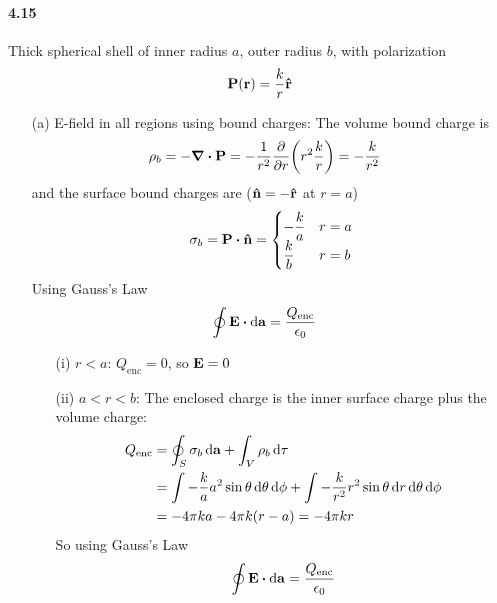 \documentclass[../main.tex]{subfiles}
\begin{document}
\pagestyle{fancy}

\setcounter{section}{7}

\paragraph{4.15} Thick spherical shell of inner radius $a$, outer radius $b$, with polarization
\begin{align*}
    \vb P (\vb r) = \frac{k}{r} \vu r    
\end{align*}
\begin{itemize}
    \item [(a)] E-field in all regions using bound charges: The volume bound charge is
    \begin{align*}
        \rho_b &= -\div \vb P = - \frac{1}{r^2} \pdv{r}(r^2 \frac{k}{r}) = -\frac{k}{r^2}
    \end{align*}
    and the surface bound charges are ($\vu n = -\vu r$ at $r = a$)
    \begin{align*}
        \sigma_b = \vb P \vdot \vu n = \begin{cases}
            -\dfrac{k}{a} & r = a \\
            \dfrac{k}{b} & r = b
        \end{cases}
    \end{align*}
    Using Gauss's Law
    \begin{align*}
        \oint \vb E \vdot \dd \vb a &= \frac{Q_\text{enc}}{\epsilon_0}
    \end{align*}
    \begin{itemize}
        \item [(i)] $r < a$: $Q_\text{enc} = 0$, so $\vb E = 0$
        \item [(ii)] $a < r < b$: The enclosed charge is the inner surface charge plus the volume charge:
        \begin{align*}
            Q_\text{enc} &= \oint_S \sigma_b \dd{\vb a} + \int_V \rho_b \dd{\tau} \\
            &= \int -\frac{k}{a} a^2 \sin\theta \dd{\theta} \dd{\phi} + \int -\frac{k}{r^2} r^2 \sin\theta \dd{r} \dd{\theta} \dd{\phi} \\
            &= -4\pi k a - 4\pi k (r - a) = -4\pi k r
        \end{align*}
        So using Gauss's Law
        \begin{align*}
            \oint \vb E \vdot \dd{\vb a} &= \frac{Q_\text{enc}}{\epsilon_0} \\

\end{align*}
\end{itemize}
\end{itemize}
\end{document}
